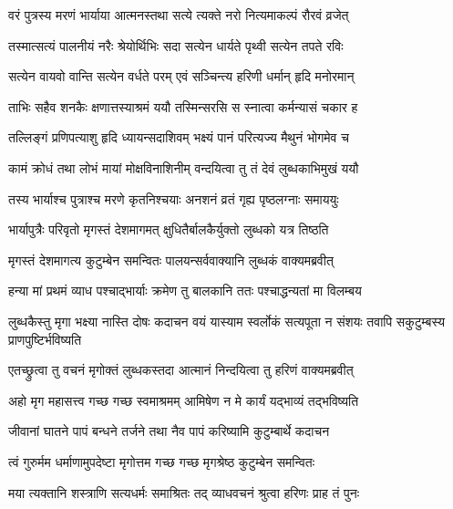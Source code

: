\twolineshloka
{वरं पुत्रस्य मरणं भार्याया आत्मनस्तथा}
{सत्ये त्यक्ते नरो नित्यमाकल्पं रौरवं व्रजेत्}%

\twolineshloka
{तस्मात्सत्यं पालनीयं नरैः श्रेयोर्थिभिः सदा}
{सत्येन धार्यते पृथ्वी सत्येन तपते रविः}%

\twolineshloka
{सत्येन वायवो वान्ति सत्येन वर्धते परम्}
{एवं सञ्चिन्त्य हरिणी धर्मान् हृदि मनोरमान्}%

\twolineshloka
{ताभिः सहैव शनकैः क्षणात्तस्याश्रमं ययौ}
{तस्मिन्सरसि स स्नात्वा कर्मन्यासं चकार ह}%

\twolineshloka
{तल्लिङ्गं प्रणिपत्याशु हृदि ध्यायन्सदाशिवम्}
{भक्ष्यं पानं परित्यज्य मैथुनं भोगमेव च}%

\twolineshloka
{कामं क्रोधं तथा लोभं मायां मोक्षविनाशिनीम्}
{वन्दयित्वा\footnotemark{} तु तं देवं लुब्धकाभिमुखं ययौ}%

\twolineshloka
{तस्य भार्याश्च पुत्राश्च मरणे कृतनिश्चयाः}
{अनशनं व्रतं गृह्य पृष्ठलग्नाः समाययुः}%

\twolineshloka
{भार्यापुत्रैः परिवृतो मृगस्तं देशमागमत्}
{क्षुधितैर्बालकैर्युक्तो लुब्धको यत्र तिष्ठति}%

\twolineshloka
{मृगस्तं देशमागत्य कुटुम्बेन समन्वितः}
{पालयन्सर्ववाक्यानि\footnotemark{} लुब्धकं वाक्यमब्रवीत्}%


\twolineshloka
{हन्या मां प्रथमं व्याध पश्चाद्भार्याः क्रमेण तु}
{बालकानि ततः पश्चाद्धन्यतां मा विलम्बय}%

\threelineshloka
{लुब्धकैस्तु मृगा भक्ष्या नास्ति दोषः कदाचन}
{वयं यास्याम स्वर्लोकं सत्यपूता न संशयः}%
{तवापि सकुटुम्बस्य प्राणपुष्टिर्भविष्यति}

\twolineshloka
{एतच्छ्रुत्वा तु वचनं मृगोक्तं लुब्धकस्तदा}
{आत्मानं निन्दयित्वा तु हरिणं वाक्यमब्रवीत्}%


\twolineshloka
{अहो मृग महासत्त्व गच्छ गच्छ स्वमाश्रमम्}
{आमिषेण न मे कार्यं यद्भाव्यं तद्भविष्यति}%

\twolineshloka
{जीवानां घातने पापं बन्धने तर्जने तथा}
{नैव पापं करिष्यामि कुटुम्बार्थे कदाचन}%

\twolineshloka
{त्वं गुरुर्मम धर्माणामुपदेष्टा मृगोत्तम}
{गच्छ गच्छ मृगश्रेष्ठ कुटुम्बेन समन्वितः}%

\twolineshloka
{मया त्यक्तानि शस्त्राणि सत्यधर्मः समाश्रितः}
{तद् व्याधवचनं श्रुत्वा हरिणः प्राह तं पुनः}%

